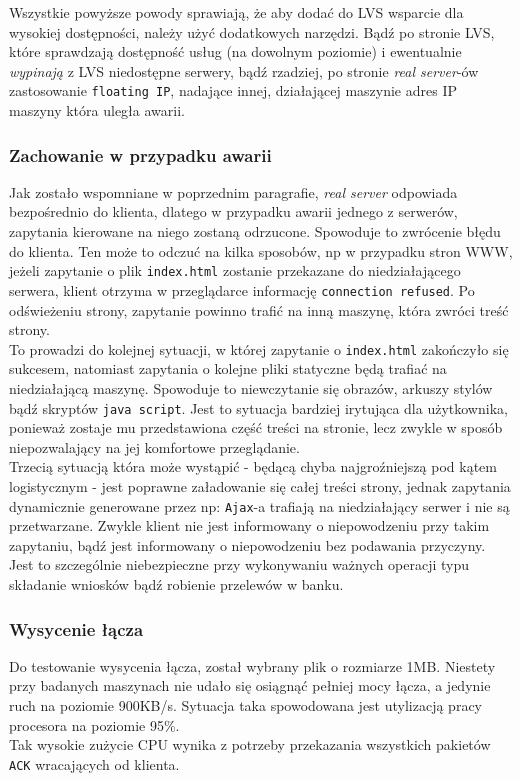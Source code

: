 Wszystkie powyższe powody sprawiają, że aby dodać do LVS wsparcie dla wysokiej dostępności, należy użyć dodatkowych narzędzi.
Bądź po stronie LVS, które sprawdzają dostępność usług (na dowolnym poziomie) i ewentualnie \textit{wypinają} z LVS niedostępne serwery, bądź rzadziej, po stronie \textit{real server}-ów zastosowanie \texttt{floating IP}, nadające innej, działającej maszynie adres IP maszyny która uległa awarii.
\subsubsection*{Zachowanie w przypadku awarii}
Jak zostało wspomniane w poprzednim paragrafie, \textit{real server} odpowiada bezpośrednio do klienta, dlatego w przypadku awarii jednego z serwerów, zapytania kierowane na niego zostaną odrzucone.
Spowoduje to zwrócenie błędu do klienta. Ten może to odczuć na kilka sposobów, np w przypadku stron WWW, jeżeli zapytanie o plik \texttt{index.html} zostanie przekazane do niedziałającego serwera, klient otrzyma w przeglądarce informację \texttt{connection refused}.
Po odświeżeniu strony, zapytanie powinno trafić na inną maszynę, która zwróci treść strony.\\
To prowadzi do kolejnej sytuacji, w której zapytanie o \texttt{index.html} zakończyło się sukcesem, natomiast zapytania o kolejne pliki statyczne będą trafiać na niedziałającą maszynę.
Spowoduje to niewczytanie się obrazów, arkuszy stylów bądź skryptów \texttt{java script}.
Jest to sytuacja bardziej irytująca dla użytkownika, ponieważ zostaje mu przedstawiona część treści na stronie, lecz zwykle w sposób niepozwalający na jej komfortowe przeglądanie.\\
Trzecią sytuacją która może wystąpić - będącą chyba najgroźniejszą pod kątem logistycznym - jest poprawne załadowanie się całej treści strony, jednak zapytania dynamicznie generowane przez np: \texttt{Ajax}-a trafiają na niedziałający serwer i nie są przetwarzane.
Zwykle klient nie jest informowany o niepowodzeniu przy takim zapytaniu, bądź jest informowany o niepowodzeniu bez podawania przyczyny.
Jest to szczególnie niebezpieczne przy wykonywaniu ważnych operacji typu składanie wniosków bądź robienie przelewów w banku.
\subsubsection*{Wysycenie łącza}
\label{sub:lvs_wysycenie_lacza}
Do testowanie wysycenia łącza, został wybrany plik o rozmiarze 1MB.
Niestety przy badanych maszynach nie udało się osiągnąć pełniej mocy łącza, a jedynie ruch na poziomie 900KB/s.
Sytuacja taka spowodowana jest utylizacją pracy procesora na poziomie 95\%.\\
Tak wysokie zużycie CPU wynika z potrzeby przekazania wszystkich pakietów \texttt{ACK} wracających od klienta.

